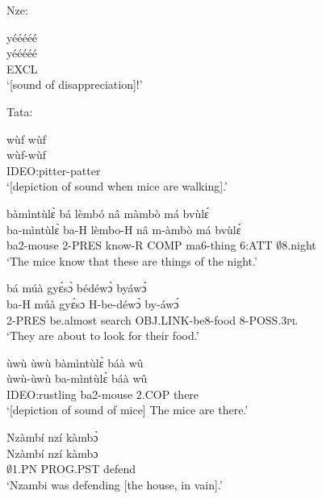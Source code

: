 \noindent Nze:

\begin{exe} 
\exN\label{193}
  \glll yééééé \\
        yééééé \\
        EXCL \\
    \trans `[sound of disappreciation]!'
\end{exe}

\noindent Tata:

\begin{exe} 
\exN\label{194} 
  \glll wùf wùf \\
        wùf-wùf \\
        IDEO:pitter-patter \\
    \trans `[depiction of sound when mice are walking].'
\end{exe}

\begin{exe} 
\exN\label{195}
  \glll bàmìntùlɛ̀ bá lèmbó nâ màmbò má bvùlɛ́ \\
        ba-mìntùlɛ̀ ba-H lèmbo-H nâ m-àmbò má bvùlɛ́ \\
     ba2-mouse 2-PRES know-R COMP ma6-thing 6:ATT $\emptyset$8.night    \\
    \trans `The mice know that these are things of the night.'
\end{exe}

\begin{exe} 
\exN\label{196} 
  \glll bá múà gyɛ́sɔ̀ bédéwɔ̀ byáwɔ́ \\
         ba-H múà gyɛ́sɔ H-be-déwɔ̀ by-áwɔ́ \\
      2-PRES be.almost search OBJ.LINK-be8-food 8-POSS.3\textsc{pl}  \\
    \trans `They are about to look for their food.'
\end{exe}

\begin{exe} 
\exN\label{197}
  \glll ùwù ùwù bàmìntùlɛ̀ báà wû \\
        ùwù-ùwù ba-mìntùlɛ̀ báà wû \\
        IDEO:rustling ba2-mouse 2.COP there \\
    \trans `[depiction of sound of mice] The mice are there.'
\end{exe}

\begin{exe} 
\exN\label{198}
  \glll Nzàmbí nzí kàmbɔ̀ \\
        Nzàmbí nzí kàmbɔ \\
        $\emptyset$1.PN PROG.PST defend \\
    \trans `Nzambi was defending [the house, in vain].'
\end{exe}

